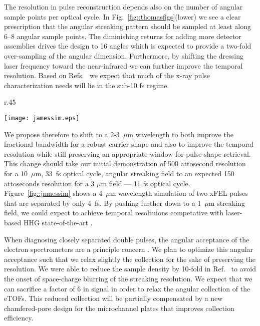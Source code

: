 The resolution in pulse reconstruction depends also on the number of angular sample points per optical cycle.
In Fig.~\ref{fig::thomasfigs}(lower) we see a clear prescription that the angular streaking pattern should be sampled at least along 6--8 angular sample points.
The diminishing returns for adding more detector assemblies drives the design to 16 angles which is expected to provide a two-fold over-sampling of the angular dimension.
Furthermore, by shifting the dressing laser frequency toward the near-infrared we can further improve the temporal resolution.
Based on Refs.~\cite{lcls2_opportunities,Cederbaum2008,Biggs2012,Mukamel2013} we expect that much of the x-ray pulse characterization needs will lie in the sub-10 fs regime.
\begin{wrapfigure}[18]{r}{.45\linewidth}
\vspace{-0.5\baselineskip}
\centerline{\texttt{[image: jamessim.eps]}}
\vspace{-0.5\baselineskip}
\caption{\label{fig::jamessim}Simulation of two attosecond x-ray pulses separated by 4~fs dressed by a 4~$\mu$m streaking field, courtesy J.~Cryan.}
\end{wrapfigure}
We propose therefore to shift to a 2-3~$\mu$m wavelength to both improve the fractional bandwidth for a robust carrier shape and also to improve the temporal resolution while still preserving an appropriate window for pulse shape retrieval.
This change should take our initial demonstration of 500 attosecond resolution for a 10~$\mu$m, 33~fs optical cycle, angular streaking field to an expected 150 attoseconds resolution for a 3 $\mu$m field --- 11 fs optical cycle.
Figure~\ref{fig::jamessim} shows a 4~$\mu$m wavelength simulation of two xFEL pulses that are separated by only 4~fs.
By pushing further down to a 1~$\mu$m streaking field, we could expect to achieve temporal resoltuions competative with laser-based HHG state-of-the-art \cite{Zenghu2017,HJWorner2017}.

When diagnosing closely separated double pulses, the angular acceptance of the electron spectrometers are a principle concern \cite{Worner2018}.
We plan to optimize this angular acceptance such that we relax slightly the collection for the sake of preserving the resolution.
We were able to reduce the sample density by 10-fold in Ref.~\cite{Nick2018} to avoid the onset of space-charge blurring of the streaking resolution.
We expect that we can sacrifice a factor of 6 in signal in order to relax the angular collection of the eTOFs.
This reduced collection will be partially compensated by a new chamfered-pore design for the microchannel plates that improves collection efficiency.


